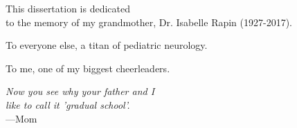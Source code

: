 %
\begin{frontmatter}

%
%
\makefrontmatter

%
%
%
%
%
%
\begin{dedication}
  This dissertation is dedicated\\
  to the memory of my grandmother, Dr. Isabelle Rapin (1927-2017).

  To everyone else, a titan of pediatric neurology.

  To me, one of my biggest cheerleaders.
\end{dedication}


%
%



%
%
\begin{epigraph} %
  \emph{Now you see why your father and I\\
    like to call it 'gradual school'.}\\
  ---Mom
\end{epigraph}

%



\end{frontmatter}
